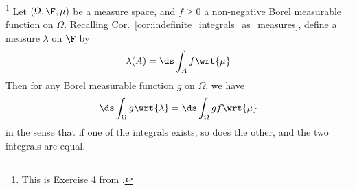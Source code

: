 \documentclass{article} %
\newcommand{\dint}{\ds\int}
\newcommand{\dmu}{\wrt{\mu}}
\begin{document}
\begin{proposition}{}\footnote{This is Exercise 4 from \cite[pp.~71]{ash2000probability}.}  Let $(\Omega, \F, \mu)$ be a measure space, and $f \geq 0$ a non-negative Borel measurable function on $\Omega$.  Recalling Cor.~\ref{cor:indefinite_integrals_as_measures}, define a measure $\lambda$ on $\F$ by 
\begin{align*}
\lambda(A)  =  \ds\int_A f \dmu
\end{align*}
Then for any Borel measurable function $g$ on $\Omega$, we have 
\begin{align*}
\dint_\Omega g \wrt{\lambda} = \dint_\Omega g f \dmu
\end{align*}
in the sense that if one of the integrals exists, so does the other, and the two integrals are equal.
\label{prop:change_of_differential} 
\end{proposition}
\end{document}
